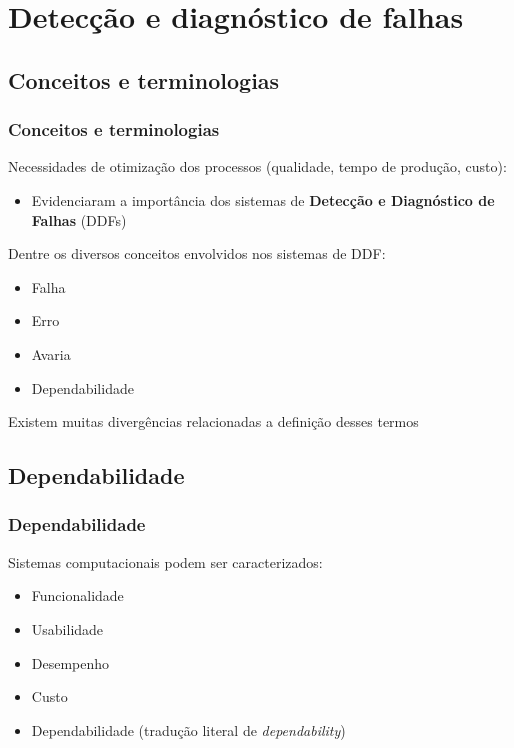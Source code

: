 \documentclass{beamer}
\begin{document}
\section{Detecção e diagnóstico de falhas}
\subsection{Conceitos e terminologias}
\begin{frame}
    \frametitle{Conceitos e terminologias}

    Necessidades de otimização dos processos (qualidade, tempo de produção,
    custo):

\begin{itemize}
    \item Evidenciaram a importância dos sistemas de {\bf Detecção e Diagnóstico
          de Falhas} (DDFs)
\end{itemize}

    Dentre os diversos conceitos envolvidos nos sistemas de DDF:

\begin{itemize}
    \item Falha
    \item Erro
    \item Avaria
    \item Dependabilidade
\end{itemize}

    Existem muitas divergências relacionadas a definição desses termos
\end{frame}

\subsection{Dependabilidade}
\begin{frame}
    \frametitle{Dependabilidade}

    Sistemas computacionais podem ser caracterizados:

\begin{itemize}
    \item Funcionalidade
    \item Usabilidade
    \item Desempenho
    \item Custo
    \item \alert{Dependabilidade} (tradução literal de {\it dependability})
\end{itemize}

\end{frame}
\end{document}
